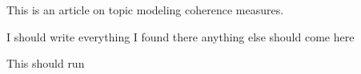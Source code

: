 \documentclass{article}
\begin{document}

This is an article on topic modeling coherence measures.

I should write everything I found there  anything else should come here 

This should run \cite{sample1}



\end{document}
